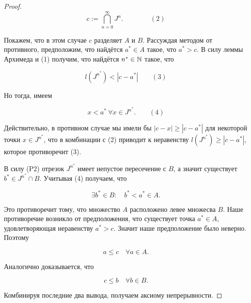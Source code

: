 \begin{proof}
        $$\displaystyle c := \bigcap_{n = 0}^{\infty} J^{n}.  \qquad\qquad (2)$$

        Покажем, что в этом случае $c$ разделяет $A$ и $B$. Рассуждая методом от противного, предположим, что найдётся $a^{*} \in A$ такое, что $a^{*} > c.$ В силу леммы Архимеда и (1) получим, что найдётся $n^{*} \in \mathbb{N}$ такое, что

        $$ l(J^{n^{*}}) < |c - a^{*}| \qquad (3)$$

        \newpage
        Но тогда, имеем

        $$ x < a^{*} \  \forall x \in J^{n^{*}}. \qquad (4)$$

        Действительно, в противном случае мы имели бы $|c-x| \geq |c - a^{*}|$ для некоторой точки $x \in J^{n^{*}}$, что в комбинации с (2) приводит к неравенству $l(J^{n^{*}}) \geq |c-a^{*}|$, которое противоречит (3).

        В силу (P2) отрезок $J^{n^{*}}$ имеет непустое пересечение с $B$, а значит существует $b^{*} \in J^{n^{*}} \cap B.$ Учитывая (4) получаем, что

        $$ \exists b^{*} \in B: \quad b^{*} < a^{*} \in A.$$

        Это противоречит тому, что множество $A$ расположено левее множесва $B$. Наше противоречие возникло от предположения, что существует точка $a^{*} \in A$, удовлетворяющая неравенству $a^{*} > c$. Значит наше предположение было неверно. Поэтому

        $$ a \leq c \quad \forall a \in A.$$

        Аналогично доказывается, что

        $$ c \leq b \quad \forall b \in B.$$

        Комбинируя последние два вывода, получаем аксиому непрерывности.
    \end{proof}
